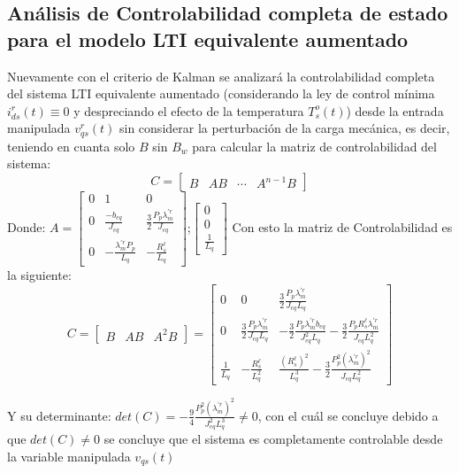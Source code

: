 \documentclass[blue,fullpaper]{ludusofficial}  %
\begin{document}
\subsection{Análisis de Controlabilidad completa de estado para el modelo LTI equivalente aumentado }
Nuevamente con el criterio de Kalman se analizará la controlabilidad completa del sistema LTI equivalente aumentado (considerando la ley de control mínima $i_{ds}^{r}(t) \equiv 0$  y despreciando el efecto de la temperatura $T_{s}^{o}(t)$) desde la entrada manipulada $v_{qs}^r(t)$ sin considerar la perturbación de la carga mecánica, es decir, teniendo en cuanta solo $B$ sin $B_w$ para calcular la matriz de controlabilidad del sistema:
\begin{equation}
    C = \begin{bmatrix} B & AB & \cdots & A^{n-1}B \end{bmatrix}
\end{equation}
Donde: $
A = \begin{bmatrix}
0 & 1 & 0 \\
0 & \frac{-b_{eq}}{J_{eq}} & \frac{3}{2}\frac{P_p\lambda_{m}^{'r}}{J_{eq}} \\
0 & -\frac{\lambda^{'r}_{m}P_p}{L_q} & -\frac{R^\ell_s}{L_q}
\end{bmatrix}
$;$\begin{bmatrix}
0 \\
 0\\
 \frac{1}{L_q}
\end{bmatrix}$
Con esto la matriz de Controlabilidad es la siguiente: 
\begin{equation}
C = \begin{bmatrix} B & AB & A^2B \end{bmatrix} = \begin{bmatrix}
0 & 0 & \frac{3}{2}\frac{P_p \lambda_{m}^{'r}}{J_{eq} L_{q}} \\
0 & \frac{3}{2}\frac{P_p \lambda_{m}^{'r}}{J_{eq} L_{q}} & -\frac{3}{2}\frac{P_p \lambda_{m}^{'r} b_{eq}}{J_{eq}^2 L_{q}} - \frac{3}{2}\frac{P_p R^\ell_s \lambda_{m}^{'r}}{J_{eq} L_{q}^2} \\
\frac{1}{L_{q}} & -\frac{R^\ell_s}{L_{q}^2} & \frac{(R^\ell_s)^{2}}{L_{q}^3} - \frac{3}{2}\frac{P_p^{2} (\lambda_{m}^{'r})^{2}}{J_{eq} L_{q}^2}\end{bmatrix}
\end{equation}

Y su determinante: $det(C)=-\frac{9}{4} \frac{P_p^2 (\lambda_{m}^{'r})^2}{J_{eq}^2 L_q^3}\neq 0$, con el cuál se concluye debido a que $det(C) \neq 0$ se concluye que el sistema es completamente controlable desde la variable manipulada $v_{qs}(t)$
\end{document}

